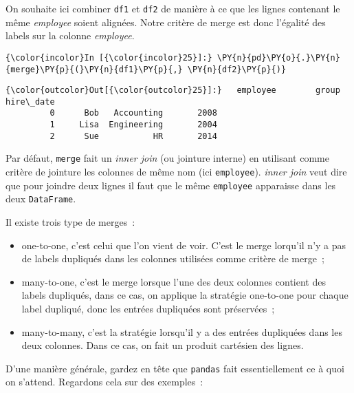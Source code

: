     On souhaite ici combiner \texttt{df1} et \texttt{df2} de manière à ce
que les lignes contenant le même \emph{employee} soient alignées. Notre
critère de merge est donc l'égalité des labels sur la colonne
\emph{employee}.

    \begin{Verbatim}[commandchars=\\\{\}]
{\color{incolor}In [{\color{incolor}25}]:} \PY{n}{pd}\PY{o}{.}\PY{n}{merge}\PY{p}{(}\PY{n}{df1}\PY{p}{,} \PY{n}{df2}\PY{p}{)}
\end{Verbatim}


\begin{Verbatim}[commandchars=\\\{\}]
{\color{outcolor}Out[{\color{outcolor}25}]:}   employee        group  hire\_date
         0      Bob   Accounting       2008
         1     Lisa  Engineering       2004
         2      Sue           HR       2014
\end{Verbatim}
            
    Par défaut, \texttt{merge} fait un \emph{inner join} (ou jointure
interne) en utilisant comme critère de jointure les colonnes de même nom
(ici \texttt{employee}). \emph{inner join} veut dire que pour joindre
deux lignes il faut que le même \texttt{employee} apparaisse dans les
deux \texttt{DataFrame}.

    Il existe trois type de merges~:

\begin{itemize}
\item
  one-to-one, c'est celui que l'on vient de voir. C'est le merge
  lorqu'il n'y a pas de labels dupliqués dans les colonnes utilisées
  comme critère de merge~;
\item
  many-to-one, c'est le merge lorsque l'une des deux colonnes contient
  des labels dupliqués, dans ce cas, on applique la stratégie one-to-one
  pour chaque label dupliqué, donc les entrées dupliquées sont
  préservées~;
\item
  many-to-many, c'est la stratégie lorsqu'il y a des entrées dupliquées
  dans les deux colonnes. Dans ce cas, on fait un produit cartésien des
  lignes.
\end{itemize}

D'une manière générale, gardez en tête que \texttt{pandas} fait
essentiellement ce à quoi on s'attend. Regardons cela sur des exemples~:


